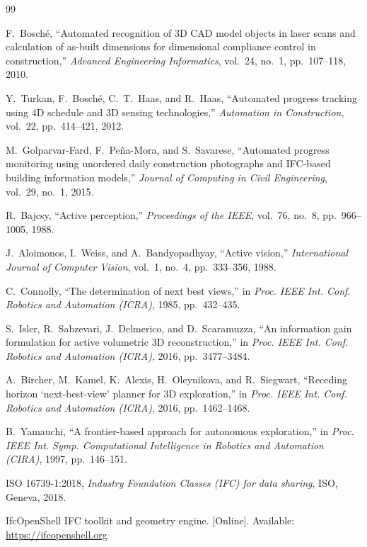 \documentclass[letterpaper, 10 pt, conference]{ieeeconf}
\begin{document}
\begin{thebibliography}{99}
\setlength{\itemsep}{-1.5pt}

F.~Bosch\'e, ``Automated recognition of 3D CAD model objects in laser scans and
calculation of as-built dimensions for dimensional compliance control in
construction,'' \emph{Advanced Engineering Informatics}, vol.~24, no.~1,
pp.~107--118, 2010.

Y.~Turkan, F.~Bosch\'e, C.~T.~Haas, and R.~Haas, ``Automated progress tracking
using 4D schedule and 3D sensing technologies,'' \emph{Automation in
Construction}, vol.~22, pp.~414--421, 2012.

M.~Golparvar-Fard, F.~Pe\~na-Mora, and S.~Savarese, ``Automated progress
monitoring using unordered daily construction photographs and IFC-based
building information models,'' \emph{Journal of Computing in Civil
Engineering}, vol.~29, no.~1, 2015.

R.~Bajcsy, ``Active perception,'' \emph{Proceedings of the IEEE}, vol.~76,
no.~8, pp.~966--1005, 1988.

J.~Aloimonos, I.~Weiss, and A.~Bandyopadhyay, ``Active vision,''
\emph{International Journal of Computer Vision}, vol.~1, no.~4, pp.~333--356,
1988.

C.~Connolly, ``The determination of next best views,'' in \emph{Proc. IEEE Int.
Conf. Robotics and Automation (ICRA)}, 1985, pp.~432--435.

S.~Isler, R.~Sabzevari, J.~Delmerico, and D.~Scaramuzza, ``An information gain
formulation for active volumetric 3D reconstruction,'' in \emph{Proc. IEEE Int.
Conf. Robotics and Automation (ICRA)}, 2016, pp.~3477--3484.

A.~Bircher, M.~Kamel, K.~Alexis, H.~Oleynikova, and R.~Siegwart, ``Receding
horizon `next-best-view' planner for 3D exploration,'' in \emph{Proc. IEEE Int.
Conf. Robotics and Automation (ICRA)}, 2016, pp.~1462--1468.

B.~Yamauchi, ``A frontier-based approach for autonomous exploration,'' in
\emph{Proc. IEEE Int. Symp. Computational Intelligence in Robotics and
Automation (CIRA)}, 1997, pp.~146--151.

ISO 16739-1:2018, \emph{Industry Foundation Classes (IFC) for data sharing},
ISO, Geneva, 2018.

IfcOpenShell IFC toolkit and geometry engine. [Online]. Available:
\url{https://ifcopenshell.org}

\end{thebibliography}
\end{document}
